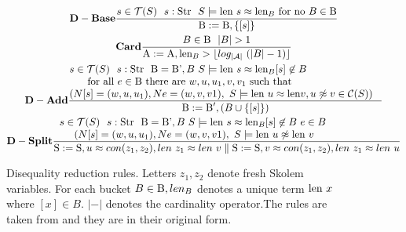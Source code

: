 \begin{figure}
\begin{minipage}{1.0\textwidth}
\scriptsize
\begin{gather*}\label{eA1}
 \bold{D-Base} \frac
 { s \in \mathcal{T}(S) \ \ s: \textnormal{Str}  \ \  S \models \textnormal{len} \ s \approx \textnormal{len}_B \textnormal{ for no }  B \in \textnormal{B} }
 { \textnormal{B}:= \textnormal{B}, \{ [s]\}}\\
  \bold{Card} \frac
  {B \in \textnormal{B} \ \ |B| > 1}
  { \textnormal{A}:= \textnormal{A}, \textnormal{len}_B >  \lfloor  log_{| \mathcal{A}|}  \ ( |B| -1) \rfloor }\\
  \bold{D-Add} \frac
  { \parbox{4.2in}{$s \in \mathcal{T}(S) \ \ s: \textnormal{Str} \ \ \textnormal{B} = \textnormal{B'}, B \   S \models \textnormal{len} \ s \approx \textnormal{len}_B  [s]  \not\in B 
  		$ \\
  		\hspace*{0.5cm}$  		\textnormal{ for all }  e \in \textnormal{B} \textnormal{ there are } w, u,u_1, v,v_1 \textnormal{ such that} 
  		 $ \\
  		 \hspace*{0.0cm}$ (N [s] = (w, u,u_1), N e = (w, v,v1), \ S \models \textnormal{len} \ u \approx \textnormal{len} v, u \not\approx v \in \mathcal{C}(S))$}}
  { \textnormal{B}:= \textnormal{B}', ( B \cup \{ [s]\})}\\
  \bold{D-Split} \frac
  { \parbox{4.5in}{$s \in \mathcal{T}(S) \ \ s: \textnormal{Str} \ \ \textnormal{B} = \textnormal{B'}, B \   S \models \textnormal{len} \ s \approx \textnormal{len}_B  [s]  \not\in B \ e \in B   		 
  		$ \\
  		\hspace*{0.5cm}$ (N [s] = (w, u,u_1), N e = (w, v,v1), \ S \models \textnormal{len} \ u \not\approx \textnormal{len}\ v $}}
  {  \textnormal{S}:=\textnormal{S}, u \approx con(z_1, z_2), len \ z_1 \approx len \ v  \parallel  \textnormal{S}:=\textnormal{S}, v \approx con(z_1, z_2), len \ z_1 \approx len \ u}
  \end{gather*}
\null
\par\xdef\tpd{\the\prevdepth}
\end{minipage}
\caption{Disequality reduction rules. Letters \( z_1, z_2\) denote fresh Skolem variables. For each bucket
\(  B \in \textnormal{B}, len_B \)  denotes a unique term \( \textnormal{len}\ x \) where \( [x] \in B \). \( |-| \) denotes the cardinality operator.The rules are taken from \cite{main-paper} and they are in their original form.}
\label{rules_5}
\end{figure}